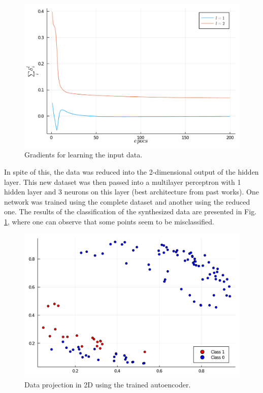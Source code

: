 \documentclass[conference]{IEEEtran}
\theoremstyle{definition}
\theoremstyle{remark}
\theoremstyle{remark}
\begin{document}
\begin{figure}
  \centering \includegraphics[width=\columnwidth]{figs/gradients-encoder.pdf}
  \caption{Gradients for learning the input data.}
  \label{fig:grad-encoder}
\end{figure}

In spite of this, the data was reduced into the 2-dimensional output of the
hidden layer. This new dataset was then passed into a multilayer perceptron with
1 hidden layer and 3 neurons on this layer (best architecture from past works).
One network was trained using the complete dataset and another using the reduced
one. The results of the classification of the synthesized data are presented in
Fig. \ref{fig:grad-encoder}, where one can observe that some points seem to be
misclassified.

\begin{figure}
  \centering \includegraphics[width=\columnwidth]{figs/reduced-dim-data.pdf}
  \caption{Data projection in 2D using the trained autoencoder.}
  \label{fig:red-data}
\end{figure}
\end{document}
